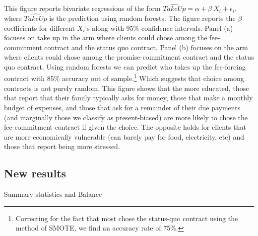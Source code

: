 \documentclass[oneside,11pt]{article}
\begin{document}
\scriptsize {
\noindent This figure reports bivariate regressions of the form $\widehat{TakeUp} = \alpha + \beta \: X_i + \epsilon_i$, where $\widehat{TakeUp}$ is the prediction using random forests. The figure reports the $\beta$ coefficients for different $X_i$'s along with 95\% confidence intervals. Panel (a) focuses on take up in the arm where clients could chose among the fee-commitment contract and the status quo contract. Panel (b) focuses on the arm where clients could chose among the promise-commitment contract and the status quo contract. Using random forests we can predict who takes up the fee-forcing contract with 85\% accuracy out of sample.\footnote{Correcting for the fact that most chose the status-quo contract using the method of SMOTE, \cite{smote} we find an accuracy rate of 75\%.} Which suggests that choice among contracts is not purely random. This figure shows that the more educated, those that report that their family typically asks for money, those that make a monthly budget of expenses, and those that ask for a remainder of their due payments (and marginally those we classify as present-biased) are more likely to chose the fee-commitment contract if given the choice. The opposite holds for clients that are more economically vulnerable (can barely pay for food, electricity, etc) and those that report being more stressed.
}



\newpage 

\subsection{New results}


\begin{table}[H]
\caption{Summary statistics and Balance}
\label{SS}
\begin{center}
\scriptsize{}
\end{center}
 \scriptsize

\end{table}
\end{document}
